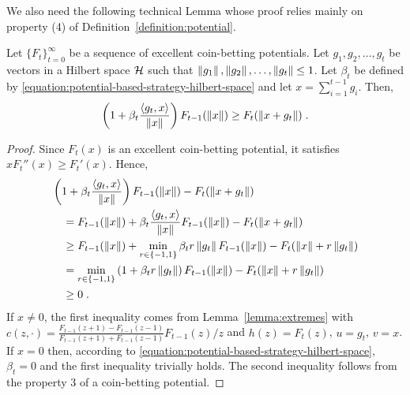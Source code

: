 We also need the following technical Lemma whose proof relies mainly on
property (4) of Definition~\ref{definition:potential}.
\begin{lemma}
\label{lemma:recursion_hilbert}
Let $\{F_t\}_{t=0}^\infty$ be a sequence of excellent coin-betting potentials.
Let $g_1, g_2, \dots, g_t$ be vectors in a Hilbert space $\mathcal{H}$ such that
$\left\|{g_1}\right\|, \left\|{g_2}\right\|, \dots, \left\|{g_t}\right\| \le 1$. Let $\beta_t$
be defined by \eqref{equation:potential-based-strategy-hilbert-space}
and let $x = \sum_{i=1}^{t-1} g_i$. Then,
\[
\left(1 + \beta_t \frac{\langle g_t, x \rangle}{\left\|{x}\right\|} \right) F_{t-1}(\left\|{x}\right\|)
\ge F_t(\left\|{x + g_t}\right\|) \; .
\]
\end{lemma}
%
\begin{proof}
Since $F_t(x)$ is an excellent coin-betting potential, it satisfies $x
F_t''(x) \ge F_t'(x)$. Hence,
\begin{align*}
&\left(1 + \beta_t \frac{\langle g_t, x \rangle}{\left\|{x}\right\|} \right) F_{t-1}(\left\|{x}\right\|) - F_t(\left\|{x + g_t}\right\|) \\
&\quad = F_{t-1}(\left\|{x}\right\|) + \beta_t \frac{\langle g_t, x \rangle}{\left\|{x}\right\|} F_{t-1}(\left\|{x}\right\|) - F_t(\left\|{x + g_t}\right\|) \\
&\quad \ge F_{t-1}(\left\|{x}\right\|)+\min_{r \in \{-1,1\}} \beta_t r \left\|{g_t}\right\| F_{t-1}(\left\|{x}\right\|) - F_t(\left\|{x}\right\| + r \left\|{g_t}\right\|) \\
&\quad =\min_{r \in \{-1,1\}} \left(1 + \beta_t r \left\|{g_t}\right\|\right) F_{t-1}(\left\|{x}\right\|) - F_t(\left\|{x}\right\| + r \left\|{g_t}\right\|) \\
&\quad \ge 0 \; .
\end{align*}
If $x \neq 0$, the first inequality comes from Lemma~\ref{lemma:extremes} with
$c(z,\cdot) = \frac{F_{t-1}(z+1) - F_{t-1}(z-1)}{F_{t-1}(z+1) + F_{t-1}(z-1)} F_{t-1}(z) / z$ and
$h(z) = F_t(z)$, $u=g_t$, $v=x$.
If $x=0$ then, according to
\eqref{equation:potential-based-strategy-hilbert-space}, $\beta_t = 0$ and the
first inequality trivially holds. The second inequality follows from the
property 3 of a coin-betting potential.
\end{proof}


